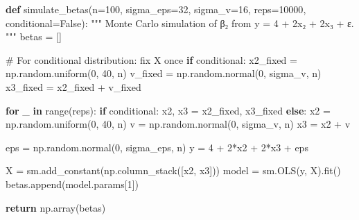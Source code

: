 \documentclass[
  letterpaper,
  DIV=11,
  numbers=noendperiod]{scrartcl}
\newenvironment{Shaded}{\begin{snugshade}}{\end{snugshade}}
\newcommand{\BuiltInTok}[1]{\textcolor[rgb]{0.00,0.23,0.31}{#1}}
\newcommand{\CommentTok}[1]{\textcolor[rgb]{0.37,0.37,0.37}{#1}}
\newcommand{\ControlFlowTok}[1]{\textcolor[rgb]{0.00,0.23,0.31}{\textbf{#1}}}
\newcommand{\DecValTok}[1]{\textcolor[rgb]{0.68,0.00,0.00}{#1}}
\newcommand{\KeywordTok}[1]{\textcolor[rgb]{0.00,0.23,0.31}{\textbf{#1}}}
\newcommand{\NormalTok}[1]{\textcolor[rgb]{0.00,0.23,0.31}{#1}}
\newcommand{\OperatorTok}[1]{\textcolor[rgb]{0.37,0.37,0.37}{#1}}
\newcommand{\VariableTok}[1]{\textcolor[rgb]{0.07,0.07,0.07}{#1}}
\begin{document}
\begin{Shaded}
\begin{Highlighting}[]
\KeywordTok{def}\NormalTok{ simulate\_betas(n}\OperatorTok{=}\DecValTok{100}\NormalTok{, sigma\_eps}\OperatorTok{=}\DecValTok{32}\NormalTok{, sigma\_v}\OperatorTok{=}\DecValTok{16}\NormalTok{, reps}\OperatorTok{=}\DecValTok{10000}\NormalTok{, conditional}\OperatorTok{=}\VariableTok{False}\NormalTok{):}
    \CommentTok{"""}
\CommentTok{    Monte Carlo simulation of β₂ from y = 4 + 2x₂ + 2x₃ + ε.}
\CommentTok{    """}
\NormalTok{    betas }\OperatorTok{=}\NormalTok{ []}
    
    \CommentTok{\# For conditional distribution: fix X once}
    \ControlFlowTok{if}\NormalTok{ conditional:}
\NormalTok{        x2\_fixed }\OperatorTok{=}\NormalTok{ np.random.uniform(}\DecValTok{0}\NormalTok{, }\DecValTok{40}\NormalTok{, n)}
\NormalTok{        v\_fixed  }\OperatorTok{=}\NormalTok{ np.random.normal(}\DecValTok{0}\NormalTok{, sigma\_v, n)}
\NormalTok{        x3\_fixed }\OperatorTok{=}\NormalTok{ x2\_fixed }\OperatorTok{+}\NormalTok{ v\_fixed}
    
    \ControlFlowTok{for}\NormalTok{ \_ }\KeywordTok{in} \BuiltInTok{range}\NormalTok{(reps):}
        \ControlFlowTok{if}\NormalTok{ conditional:}
\NormalTok{            x2, x3 }\OperatorTok{=}\NormalTok{ x2\_fixed, x3\_fixed}
        \ControlFlowTok{else}\NormalTok{:}
\NormalTok{            x2 }\OperatorTok{=}\NormalTok{ np.random.uniform(}\DecValTok{0}\NormalTok{, }\DecValTok{40}\NormalTok{, n)}
\NormalTok{            v  }\OperatorTok{=}\NormalTok{ np.random.normal(}\DecValTok{0}\NormalTok{, sigma\_v, n)}
\NormalTok{            x3 }\OperatorTok{=}\NormalTok{ x2 }\OperatorTok{+}\NormalTok{ v}

\NormalTok{        eps }\OperatorTok{=}\NormalTok{ np.random.normal(}\DecValTok{0}\NormalTok{, sigma\_eps, n)}
\NormalTok{        y }\OperatorTok{=} \DecValTok{4} \OperatorTok{+} \DecValTok{2}\OperatorTok{*}\NormalTok{x2 }\OperatorTok{+} \DecValTok{2}\OperatorTok{*}\NormalTok{x3 }\OperatorTok{+}\NormalTok{ eps}

\NormalTok{        X }\OperatorTok{=}\NormalTok{ sm.add\_constant(np.column\_stack([x2, x3]))}
\NormalTok{        model }\OperatorTok{=}\NormalTok{ sm.OLS(y, X).fit()}
\NormalTok{        betas.append(model.params[}\DecValTok{1}\NormalTok{])}

    \ControlFlowTok{return}\NormalTok{ np.array(betas)}
\end{Highlighting}
\end{Shaded}
\end{document}
